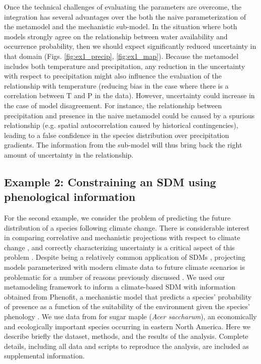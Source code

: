 Once the technical challenges of evaluating the parameters are overcome, the integration has several advantages over the both the naive parameterization of the metamodel and the mechanistic sub-model. 
In the situation where both models strongly agree on the relationship between water availability and occurrence probability, then we should expect significantly reduced uncertainty in that domain (Figs. \ref{fig:ex1_precip}, \ref{fig:ex1_map}).
Because the metamodel includes both temperature and precipitation, any reduction in the uncertainty with respect to precipitation might also influence the evaluation of the relationship with temperature (reducing bias in the case where there is a correlation between T and P in the data). 
However, uncertainty could increase in the case of model disagreement.
For instance, the relationship between precipitation and presence in the naive metamodel could be caused by a spurious relationship (e.g. spatial autocorrelation caused by historical contingencies), leading to a false confidence in the species distribution over precipitation gradients. 
The information from the sub-model will thus bring back the right amount of uncertainty in the relationship.

\subsection*{Example 2: Constraining an SDM using phenological information}
For the second example, we consider the problem of predicting the future distribution of a species following climate change.
There is considerable interest in comparing correlative and mechanistic projections with respect to climate change \citep{Morin2009}, and correctly characterizing uncertainty is a critical aspect of this problem \citep{Cheaib2012}.
Despite being a relatively common application of \ac{SDM}s \citep{Guisan2005}, projecting models parameterized with modern climate data to future climate scenarios is problematic for a number of reasons previously discussed \citep{Araujo2006, Austin2011}.
We used our metamodeling framework to inform a climate-based SDM with information obtained from Phenofit, a mechanistic model that predicts a species' probability of presence as a function of the suitability of the environment given the species' phenology \citep{Chuine2001, Morin2009}.
We use data from \citet{Morin2009} for sugar maple (\emph{Acer saccharum}), an economically and ecologically important species occurring in eastern North America.
Here we describe briefly the dataset, methods, and the results of the analysis.
Complete details, including all data and scripts to reproduce the analysis, are included as supplemental information.


